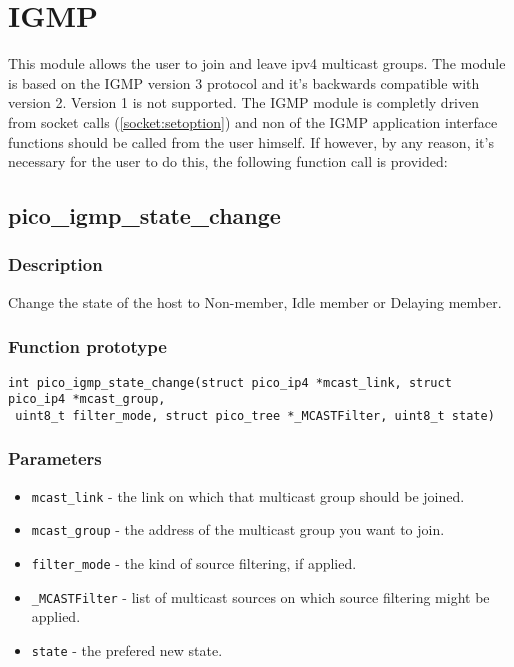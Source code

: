 \section{IGMP}

This module allows the user to join and leave ipv4 multicast groups. The module is based on the IGMP version 3 protocol and it's backwards compatible with version 2. Version 1 is not supported. 
The IGMP module is completly driven from socket calls (\ref{socket:setoption}) and non of the IGMP application interface functions should be called from the user himself. If however, by any reason, it's necessary for the user to do this, the following function call is provided:

\subsection{pico\_igmp\_state\_change}

\subsubsection*{Description}
Change the state of the host to Non-member, Idle member or Delaying member.

\subsubsection*{Function prototype}
\begin{verbatim}
int pico_igmp_state_change(struct pico_ip4 *mcast_link, struct pico_ip4 *mcast_group,
 uint8_t filter_mode, struct pico_tree *_MCASTFilter, uint8_t state)
\end{verbatim}

\subsubsection*{Parameters}
\begin{itemize}[noitemsep]
\item \texttt{mcast\_link} - the link on which that multicast group should be joined.
\item \texttt{mcast\_group} - the address of the multicast group you want to join.
\item \texttt{filter\_mode} - the kind of source filtering, if applied.
\item \texttt{\_MCASTFilter} - list of multicast sources on which source filtering might be applied. 
\item \texttt{state} - the prefered new state.
\end{itemize}

